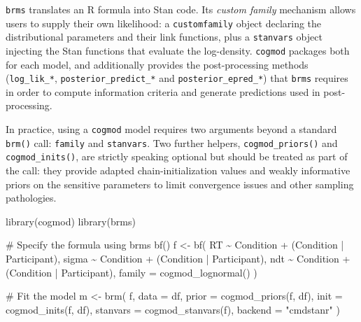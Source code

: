 \documentclass[
  jou,
  floatsintext,
  longtable,
  nolmodern,
  notxfonts,
  notimes,
  12pt,
  colorlinks=true,linkcolor=blue,citecolor=blue,urlcolor=blue]{apa7}
\newenvironment{Shaded}{\begin{snugshade}}{\end{snugshade}}
\newcommand{\AttributeTok}[1]{\textcolor[rgb]{0.40,0.45,0.13}{#1}}
\newcommand{\CommentTok}[1]{\textcolor[rgb]{0.37,0.37,0.37}{#1}}
\newcommand{\FunctionTok}[1]{\textcolor[rgb]{0.28,0.35,0.67}{#1}}
\newcommand{\NormalTok}[1]{\textcolor[rgb]{0.00,0.23,0.31}{#1}}
\newcommand{\OtherTok}[1]{\textcolor[rgb]{0.00,0.23,0.31}{#1}}
\newcommand{\SpecialCharTok}[1]{\textcolor[rgb]{0.37,0.37,0.37}{#1}}
\newcommand{\StringTok}[1]{\textcolor[rgb]{0.13,0.47,0.30}{#1}}
\begin{document}
\texttt{brms} translates an R formula into Stan code. Its \emph{custom
family} mechanism allows users to supply their own likelihood: a
\texttt{customfamily} object declaring the distributional parameters and
their link functions, plus a \texttt{stanvars} object injecting the Stan
functions that evaluate the log-density. \texttt{cogmod} packages both
for each model, and additionally provides the post-processing methods
(\texttt{log\_lik\_*}, \texttt{posterior\_predict\_*} and
\texttt{posterior\_epred\_*}) that \texttt{brms} requires in order to
compute information criteria and generate predictions used in
post-processing.

In practice, using a \texttt{cogmod} model requires two arguments beyond
a standard \texttt{brm()} call: \texttt{family} and \texttt{stanvars}.
Two further helpers, \texttt{cogmod\_priors()} and
\texttt{cogmod\_inits()}, are strictly speaking optional but should be
treated as part of the call: they provide adapted chain-initialization
values and weakly informative priors on the sensitive parameters to
limit convergence issues and other sampling pathologies.

\begin{Shaded}
\begin{Highlighting}[]
\FunctionTok{library}\NormalTok{(cogmod)}
\FunctionTok{library}\NormalTok{(brms)}

\CommentTok{\# Specify the formula using brms\textquotesingle{} bf()}
\NormalTok{f }\OtherTok{\textless{}{-}} \FunctionTok{bf}\NormalTok{(}
\NormalTok{  RT }\SpecialCharTok{\textasciitilde{}}\NormalTok{ Condition }\SpecialCharTok{+}
\NormalTok{    (Condition }\SpecialCharTok{|}\NormalTok{ Participant),}
\NormalTok{  sigma }\SpecialCharTok{\textasciitilde{}}\NormalTok{ Condition }\SpecialCharTok{+}
\NormalTok{    (Condition }\SpecialCharTok{|}\NormalTok{ Participant),}
\NormalTok{  ndt }\SpecialCharTok{\textasciitilde{}}\NormalTok{ Condition }\SpecialCharTok{+}
\NormalTok{    (Condition }\SpecialCharTok{|}\NormalTok{ Participant),}
  \AttributeTok{family =} \FunctionTok{cogmod\_lognormal}\NormalTok{()}
\NormalTok{)}

\CommentTok{\# Fit the model}
\NormalTok{m }\OtherTok{\textless{}{-}} \FunctionTok{brm}\NormalTok{(}
\NormalTok{  f,}
  \AttributeTok{data =}\NormalTok{ df,}
  \AttributeTok{prior =} \FunctionTok{cogmod\_priors}\NormalTok{(f, df),}
  \AttributeTok{init =} \FunctionTok{cogmod\_inits}\NormalTok{(f, df),}
  \AttributeTok{stanvars =} \FunctionTok{cogmod\_stanvars}\NormalTok{(f),}
  \AttributeTok{backend =} \StringTok{"cmdstanr"}
\NormalTok{)}
\end{Highlighting}
\end{Shaded}
\end{document}
